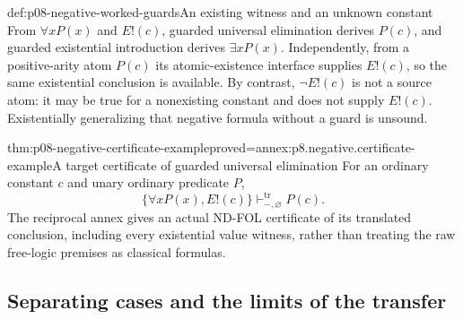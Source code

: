 \begin{hbexample}{def:p08-negative-worked-guards}{An existing witness and an unknown constant}
From \(\forall xP(x)\) and \(E!(c)\), guarded universal elimination
derives \(P(c)\), and guarded existential introduction derives
\(\exists xP(x)\).  Independently, from a positive-arity atom \(P(c)\)
its atomic-existence interface supplies \(E!(c)\), so the same existential
conclusion is available.  By contrast, \(\neg E!(c)\) is not a source
atom: it may be true for a nonexisting constant and does not supply
\(E!(c)\).  Existentially generalizing that negative formula without a
guard is unsound.
\end{hbexample}

\begin{hblemma}{thm:p08-negative-certificate-example}{proved=annex:p8.negative.certificate-example}{A target certificate of guarded universal elimination}
For an ordinary constant \(c\) and unary ordinary predicate \(P\),
\[
 \{\forall xP(x),E!(c)\}\vdash^{\mathrm{tr}}_{-,\varnothing}P(c).
\]
The reciprocal annex gives an actual ND-FOL certificate of its translated
conclusion, including every existential value witness, rather than treating
the raw free-logic premises as classical formulas.
\end{hblemma}

\subsection{Separating cases and the limits of the transfer}


